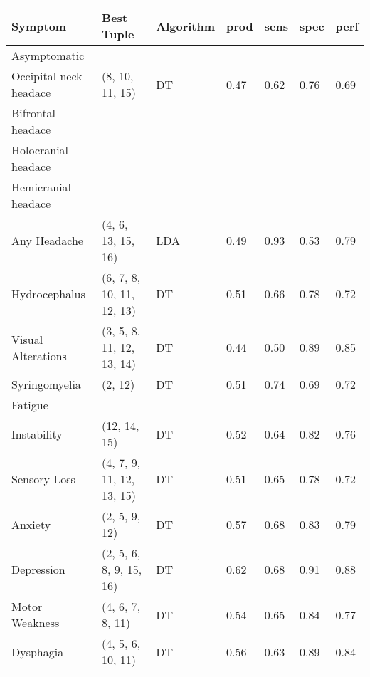 \begin{tabular}{lllllll}
\toprule
                             Symptom &                 Best Tuple & Algorithm & prod & sens & spec & perf \\
\midrule
                        Asymptomatic &                            &           &      &      &      &      \\
              Occipital neck headace &            (8, 10, 11, 15) &        DT & 0.47 & 0.62 & 0.76 & 0.69 \\
                   Bifrontal headace &                            &           &      &      &      &      \\
                 Holocranial headace &                            &           &      &      &      &      \\
                 Hemicranial headace &                            &           &      &      &      &      \\
                        Any Headache &         (4, 6, 13, 15, 16) &       LDA & 0.49 & 0.93 & 0.53 & 0.79 \\
                       Hydrocephalus &  (6, 7, 8, 10, 11, 12, 13) &        DT & 0.51 & 0.66 & 0.78 & 0.72 \\
                  Visual Alterations &  (3, 5, 8, 11, 12, 13, 14) &        DT & 0.44 & 0.50 & 0.89 & 0.85 \\
                       Syringomyelia &                    (2, 12) &        DT & 0.51 & 0.74 & 0.69 & 0.72 \\
                             Fatigue &                            &           &      &      &      &      \\
                         Instability &               (12, 14, 15) &        DT & 0.52 & 0.64 & 0.82 & 0.76 \\
                        Sensory Loss &  (4, 7, 9, 11, 12, 13, 15) &        DT & 0.51 & 0.65 & 0.78 & 0.72 \\
                             Anxiety &              (2, 5, 9, 12) &        DT & 0.57 & 0.68 & 0.83 & 0.79 \\
                          Depression &    (2, 5, 6, 8, 9, 15, 16) &        DT & 0.62 & 0.68 & 0.91 & 0.88 \\
                      Motor Weakness &           (4, 6, 7, 8, 11) &        DT & 0.54 & 0.65 & 0.84 & 0.77 \\
                           Dysphagia &          (4, 5, 6, 10, 11) &        DT & 0.56 & 0.63 & 0.89 & 0.84 \\

\end{tabular}
